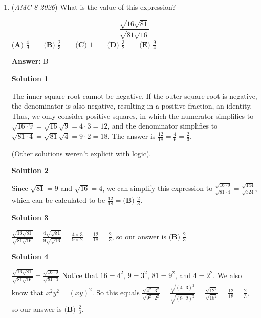 \begin{enumerate}
 


 


	\item (\textit{AMC 8 2026}) What is the value of this expression?


 
 \[\frac{\sqrt{16\sqrt{81}}}{\sqrt{81\sqrt{16}}}\]
$\textbf{(A) } \frac{4}{9}\qquad\textbf{(B) } \frac{2}{3}\qquad\textbf{(C) } 1\qquad\textbf{(D) } \frac{3}{2}\qquad\textbf{(E) } \frac{9}{4}$

 \textbf{Answer: }B



\textbf{Solution 1}

The inner square root cannot be negative. If the outer square root is negative, the denominator is also negative, resulting in a positive fraction, an identity. Thus, we only consider positive squares, in which the numerator simplifies to $\sqrt{16 \cdot 9} = \sqrt{16}\sqrt{9} = 4 \cdot 3 = 12$, and the denominator simplifies to $\sqrt{81 \cdot 4} = \sqrt{81}\sqrt{4} = 9 \cdot 2 = 18$. The answer is $\frac{12}{18} = \frac{4}{6} = \boxed{\frac{2}{3}}$.

 (Other solutions weren't explicit with logic).

 



\textbf{Solution 2}

Since $\sqrt{81} = 9$ and $\sqrt{16} = 4$, we can simplify this expression to $\frac{\sqrt{16\cdot 9}}{\sqrt{81\cdot 4}} = \frac{\sqrt{144}}{\sqrt{324}}$, which can be calculated to be $\frac{12}{18} = \boxed{ \textbf{(B) } \frac{2}{3}}$.

 



\textbf{Solution 3}

$\frac{\sqrt{16\sqrt{81}}}{\sqrt{81\sqrt{16}}}=\frac{4\sqrt{\sqrt{81}}}{9\sqrt{\sqrt{16}}}=\frac{4\times3}{9\times2}=\frac{12}{18}=\frac23$, so our answer is $\boxed{ \textbf{(B) } \frac{2}{3}}$.

 



\textbf{Solution 4}

$\frac{\sqrt{16\sqrt{81}}}{\sqrt{81\sqrt{16}}}=\frac{\sqrt{16\cdot9}}{\sqrt{81\cdot4}}$ Notice that $16=4^2$, $9=3^2$, $81=9^2$, and $4=2^2$. We also know that $x^2 y^2 = (xy)^2$. So this equals $\frac{\sqrt{4^2\cdot3^2}}{\sqrt{9^2\cdot2^2}}=\frac{\sqrt{(4\cdot3)^2}}{\sqrt{(9\cdot2)^2}}=\frac{\sqrt{12^2}}{\sqrt{18^2}}=\frac{12}{18}=\frac{2}{3}$, so our answer is $\boxed{ \textbf{(B) } \frac{2}{3}}$.


\end{enumerate}
